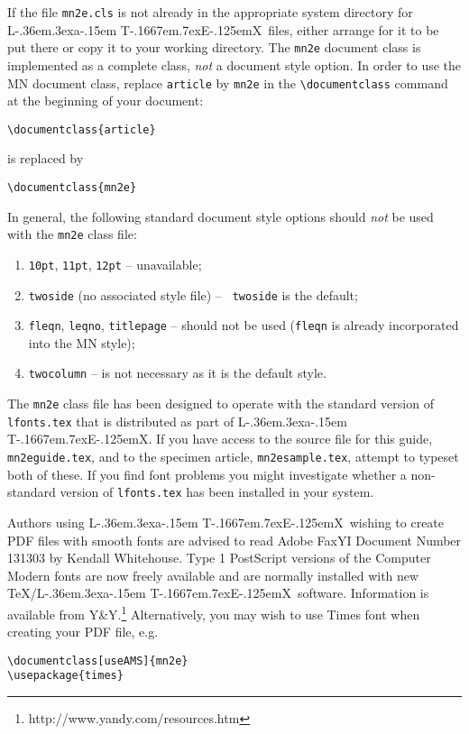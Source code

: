 \documentclass[useAMS,usenatbib]{mn2e}
\def\LaTeX{L\kern-.36em\raise.3ex\hbox{a}\kern-.15em
    T\kern-.1667em\lower.7ex\hbox{E}\kern-.125emX}
\begin{document}
If the file \verb"mn2e.cls" is not already in the appropriate system
directory for \LaTeX\ files, either arrange for it to be put there or copy
it to your working directory. The {\tt mn2e} document class is implemented
as a complete class, {\em not\/} a document style option. In order to use
the MN document class, replace \verb"article" by \verb"mn2e" in the
\verb"\documentclass" command at the beginning of your document:
%
\begin{verbatim}
\documentclass{article}
\end{verbatim}
%
is replaced by
%
\begin{verbatim}
\documentclass{mn2e}
\end{verbatim}
%
In general, the following standard document style options should {\em
not\/} be used with the {\tt mn2e} class file:
%
\begin{enumerate}
  \item {\tt 10pt}, {\tt 11pt}, {\tt 12pt} -- unavailable;
  \item {\tt twoside} (no associated style file) -- {\tt
     twoside} is the default;
  \item {\tt fleqn}, {\tt leqno}, {\tt titlepage} --
        should not be used (\verb"fleqn" is already incorporated into
        the MN style);
  \item {\tt twocolumn} -- is not necessary as it is the default style.
\end{enumerate}
%

The {\tt mn2e} class file has been designed to operate with the standard
version of \verb"lfonts.tex" that is distributed as part of \LaTeX. If you
have access to the source file for this guide, \verb"mn2eguide.tex", and to
the specimen article, \verb"mn2esample.tex", attempt to typeset both of
these. If you find font problems you might investigate whether a
non-standard version of \verb"lfonts.tex" has been installed in your
system.

Authors using \LaTeX\ wishing to create PDF files with smooth
fonts are advised to read Adobe FaxYI Document Number 131303 by
Kendall Whitehouse. Type 1 PostScript versions of the Computer
Modern fonts are now freely available and are normally installed
with new \TeX/\LaTeX\ software. Information is available from
Y\&Y.\footnote{http://www.yandy.com/resources.htm} Alternatively,
you may wish to use Times font when creating your PDF file, e.g.\\
\begin{verbatim}
\documentclass[useAMS]{mn2e}
\usepackage{times}
\end{verbatim}
\end{document}

